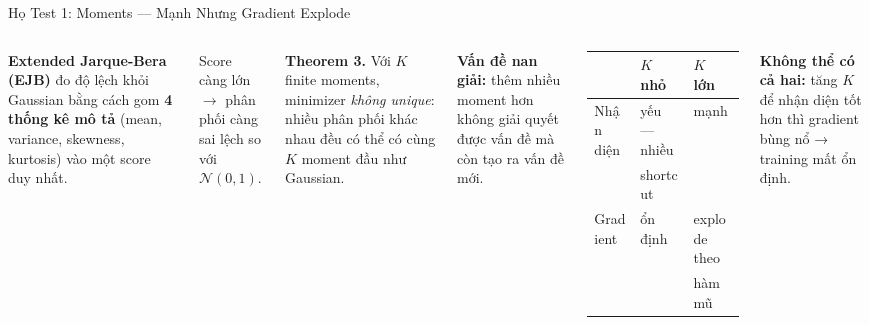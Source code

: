 \documentclass[aspectratio=169,9pt]{beamer}
\begin{document}
\begin{frame}{Họ Test 1: Moments — Mạnh Nhưng Gradient Explode}

\begin{columns}[T]

\textbf{Extended Jarque-Bera (EJB)} đo độ lệch khỏi Gaussian bằng cách gom \textbf{4 thống kê mô tả} (mean, variance, skewness, kurtosis) vào một score duy nhất.

\vspace{0.3em}
Score càng lớn $\rightarrow$ phân phối càng sai lệch so với $\mathcal{N}(0,1)$.

\vspace{0.5em}


\vspace{0.3em}

\begin{badbox}
\footnotesize\textbf{Theorem 3.} Với $K$ finite moments, minimizer \emph{không unique}: nhiều phân phối khác nhau đều có thể có cùng $K$ moment đầu như Gaussian.
\end{badbox}

\vspace{0.5em}
\textbf{Vấn đề nan giải:} thêm nhiều moment hơn không giải quyết được vấn đề mà còn tạo ra vấn đề mới.

\vspace{0.5em}
\begin{tabular}{@{}lll@{}}
\toprule
 & $K$ nhỏ & $K$ lớn \\
\midrule
Nhận diện & \textcolor{mbad}{yếu} — nhiều & \textcolor{mgood}{mạnh} \\
& shortcut & \\
Gradient & \textcolor{mgood}{ổn định} & \textcolor{mbad}{explode} theo \\
& & hàm mũ \\
\bottomrule
\end{tabular}

\vspace{0.6em}
\begin{badbox}
\footnotesize\textbf{Không thể có cả hai:} tăng $K$ để nhận diện tốt hơn thì gradient bùng nổ → training mất ổn định.
\end{badbox}

\end{columns}
\end{frame}
\end{document}
